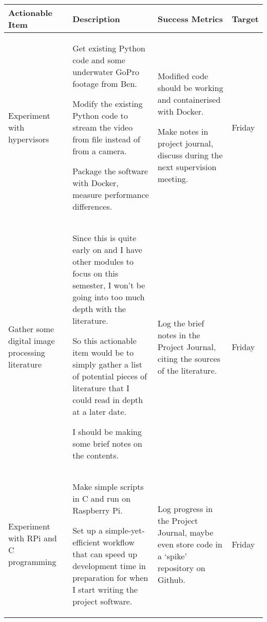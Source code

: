 \pagebreak
\begin{table}[!h]
    \centering
    \begin{tabularx}{\textwidth}{|X|X|X|l|}
        \hline
        Actionable Item & Description & Success Metrics & Target \\
        \hline
        \hline
        Experiment with hypervisors &
        \begin{myitemize}
            \item Get existing Python code and some underwater GoPro footage from Ben.
            \item Modify the existing Python code to stream the video from file instead of from a camera.
            \item Package the software with Docker, measure performance differences.
        \end{myitemize} &
        \begin{myitemize}
            \item Modified code should be working and containerised with Docker.
            \item Make notes in project journal, discuss during the next supervision meeting.
        \end{myitemize} &
        Friday \\
        \hline
        Gather some digital image processing literature &
        \begin{myitemize}
            \item Since this is quite early on and I have other modules to focus on this semester, I won't be going into too much depth with the literature.
            \item So this actionable item would be to simply gather a list of potential pieces of literature that I could read in depth at a later date.
            \item I should be making some brief notes on the contents.
        \end{myitemize} &
        \begin{myitemize}
            \item Log the brief notes in the Project Journal, citing the sources of the literature.
        \end{myitemize} &
        Friday \\
        \hline
        Experiment with RPi and C programming &
        \begin{myitemize}
            \item Make simple scripts in C and run on Raspberry Pi.
            \item Set up a simple-yet-efficient workflow that can speed up development time in preparation for when I start writing the project software.
        \end{myitemize} &
        \begin{myitemize}
            \item Log progress in the Project Journal, maybe even store code in a `spike' repository on Github.
        \end{myitemize} &
        Friday \\
        \hline
    \end{tabularx}
\end{table}
